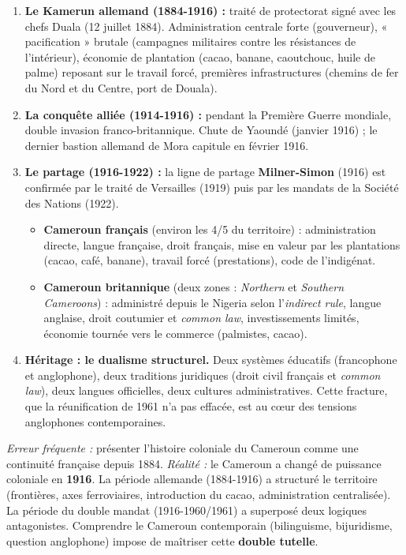 \documentclass[11pt]{article}
\begin{document}
\begin{enumerate}
\item \textbf{Le Kamerun allemand (1884-1916) :} traité de protectorat signé avec les chefs Duala (12 juillet 1884). Administration centrale forte (gouverneur), « pacification » brutale (campagnes militaires contre les résistances de l'intérieur), économie de plantation (cacao, banane, caoutchouc, huile de palme) reposant sur le travail forcé, premières infrastructures (chemins de fer du Nord et du Centre, port de Douala).
\item \textbf{La conquête alliée (1914-1916) :} pendant la Première Guerre mondiale, double invasion franco-britannique. Chute de Yaoundé (janvier 1916) ; le dernier bastion allemand de Mora capitule en février 1916.
\item \textbf{Le partage (1916-1922) :} la ligne de partage \textbf{Milner-Simon} (1916) est confirmée par le traité de Versailles (1919) puis par les mandats de la Société des Nations (1922).
\begin{itemize}
\item \textbf{Cameroun français} (environ les 4/5 du territoire) : administration directe, langue française, droit français, mise en valeur par les plantations (cacao, café, banane), travail forcé (prestations), code de l'indigénat.
\item \textbf{Cameroun britannique} (deux zones : \emph{Northern} et \emph{Southern Cameroons}) : administré depuis le Nigeria selon l'\emph{indirect rule}, langue anglaise, droit coutumier et \emph{common law}, investissements limités, économie tournée vers le commerce (palmistes, cacao).
\end{itemize}
\item \textbf{Héritage : le dualisme structurel.} Deux systèmes éducatifs (francophone et anglophone), deux traditions juridiques (droit civil français et \emph{common law}), deux langues officielles, deux cultures administratives. Cette fracture, que la réunification de 1961 n'a pas effacée, est au cœur des tensions anglophones contemporaines.
\end{enumerate}

\begin{attention}
\emph{Erreur fréquente :} présenter l'histoire coloniale du Cameroun comme une continuité française depuis 1884.
\emph{Réalité :} le Cameroun a changé de puissance coloniale en \textbf{1916}. La période allemande (1884-1916) a structuré le territoire (frontières, axes ferroviaires, introduction du cacao, administration centralisée). La période du double mandat (1916-1960/1961) a superposé deux logiques antagonistes. Comprendre le Cameroun contemporain (bilinguisme, bijuridisme, question anglophone) impose de maîtriser cette \textbf{double tutelle}.
\end{attention}
\end{document}
